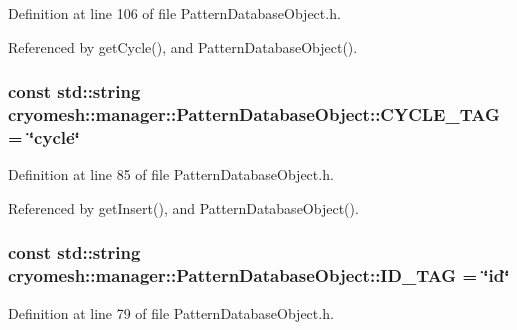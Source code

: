 \-Definition at line 106 of file \-Pattern\-Database\-Object.\-h.



\-Referenced by get\-Cycle(), and \-Pattern\-Database\-Object().

\hypertarget{classcryomesh_1_1manager_1_1PatternDatabaseObject_ac6763548916adb57eb5b03035049cc12}{
\subsubsection[{\-C\-Y\-C\-L\-E\-\_\-\-T\-A\-G}]{\setlength{\rightskip}{0pt plus 5cm}const std\-::string {\bf cryomesh\-::manager\-::\-Pattern\-Database\-Object\-::\-C\-Y\-C\-L\-E\-\_\-\-T\-A\-G} = \char`\"{}cycle\char`\"{}}}\label{classcryomesh_1_1manager_1_1PatternDatabaseObject_ac6763548916adb57eb5b03035049cc12}


\-Definition at line 85 of file \-Pattern\-Database\-Object.\-h.



\-Referenced by get\-Insert(), and \-Pattern\-Database\-Object().

\hypertarget{classcryomesh_1_1manager_1_1PatternDatabaseObject_a3d300a264abb64a0f26e36818df0c228}{
\subsubsection[{\-I\-D\-\_\-\-T\-A\-G}]{\setlength{\rightskip}{0pt plus 5cm}const std\-::string {\bf cryomesh\-::manager\-::\-Pattern\-Database\-Object\-::\-I\-D\-\_\-\-T\-A\-G} = \char`\"{}id\char`\"{}}}\label{classcryomesh_1_1manager_1_1PatternDatabaseObject_a3d300a264abb64a0f26e36818df0c228}


\-Definition at line 79 of file \-Pattern\-Database\-Object.\-h.




